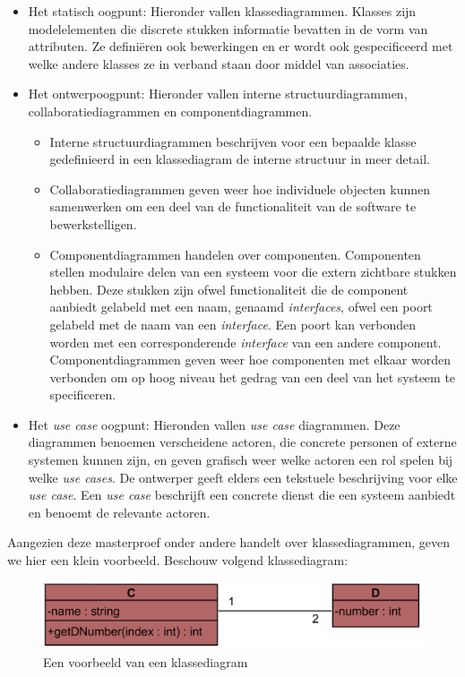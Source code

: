 \begin{itemize}
	\item Het statisch oogpunt: Hieronder vallen klassediagrammen. Klasses zijn modelelementen die discrete stukken informatie bevatten in de vorm van attributen. Ze defini\"eren ook bewerkingen en er wordt ook gespecificeerd met welke andere klasses ze in verband staan door middel van associaties.
	\item Het ontwerpoogpunt: Hieronder vallen interne structuurdiagrammen, collaboratiediagrammen en componentdiagrammen.
	\begin{itemize}
		\item Interne structuurdiagrammen beschrijven voor een bepaalde klasse gedefinieerd in een klassediagram de interne structuur in meer detail.
		\item Collaboratiediagrammen geven weer hoe individuele objecten kunnen samenwerken om een deel van de functionaliteit van de software te bewerkstelligen.
		\item Componentdiagrammen handelen over componenten. Componenten stellen modulaire delen van een systeem voor die extern zichtbare stukken hebben. Deze stukken zijn ofwel functionaliteit die de component aanbiedt gelabeld met een naam, genaamd \textit{interfaces}, ofwel een poort gelabeld met de naam van een \textit{interface}. Een poort kan verbonden worden met een corresponderende \textit{interface} van een andere component. Componentdiagrammen geven weer hoe componenten met elkaar worden verbonden om op hoog niveau het gedrag van een deel van het systeem te specificeren.
	\end{itemize}
	\item Het \textit{use case} oogpunt: Hieronden vallen \textit{use case} diagrammen. Deze diagrammen benoemen verscheidene actoren, die concrete personen of externe systemen kunnen zijn, en geven grafisch weer welke actoren een rol spelen bij welke \textit{use cases}. De ontwerper geeft elders een tekstuele beschrijving voor elke \textit{use case}. Een \textit{use case} beschrijft een concrete dienst die een systeem aanbiedt en benoemt de relevante actoren.
\end{itemize}

Aangezien deze masterproef onder andere handelt over klassediagrammen, geven we hier een klein voorbeeld. Beschouw volgend klassediagram:

\begin{figure}[H]
	\label{fig:cd}
	\centering
	\includegraphics{intro/cd.png}
	\caption{Een voorbeeld van een klassediagram}
\end{figure}

